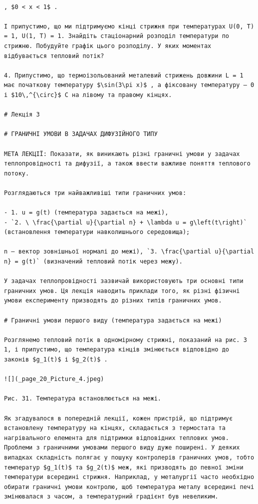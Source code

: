 \documentclass[
]{article}
\begin{document}
\begin{verbatim}

, $0 < x < 1$ .

І припустимо, що ми підтримуємо кінці стрижня при температурах U(0, T) = 1, U(1, T) = 1. Знайдіть стаціонарний розподіл температури по стрижню. Побудуйте графік цього розподілу. У яких моментах відбувається тепловий потік?

4. Припустимо, що термоізольований металевий стрижень довжини L = 1 має початкову температуру $\sin(3\pi x)$ , а фіксовану температуру — 0 і $10\,^{\circ}$ C на лівому та правому кінцях.

# Лекція 3

# ГРАНИЧНІ УМОВИ В ЗАДАЧАХ ДИФУЗІЙНОГО ТИПУ

МЕТА ЛЕКЦІЇ: Показати, як виникають різні граничні умови у задачах теплопровідності та дифузії, а також ввести важливе поняття теплового потоку.

Розглядаються три найважливіші типи граничних умов:

- 1. u = g(t) (температура задається на межі),
- `2. \ \frac{\partial u}{\partial n} + \lambda u = g\left(t\right)` (встановлення температури навколишнього середовища);

n — вектор зовнішньої нормалі до межі), `3. \frac{\partial u}{\partial n} = g(t)` (визначений тепловий потік через межу).

У задачах теплопровідності зазвичай використовують три основні типи граничних умов. Ця лекція наводить приклади того, як різні фізичні умови експерименту призводять до різних типів граничних умов.

# Граничні умови першого виду (температура задається на межі)

Розглянемо тепловий потік в одномірному стрижні, показаний на рис. 3 1, і припустимо, що температура кінців змінюється відповідно до законів $g_1(t)$ і $g_2(t)$ .

![](_page_20_Picture_4.jpeg)

Рис. 31. Температура встановлюється на межі.

Як згадувалося в попередній лекції, кожен пристрій, що підтримує встановлену температуру на кінцях, складається з термостата та нагрівального елемента для підтримки відповідних теплових умов. Проблеми з граничними умовами першого виду дуже поширені. У деяких випадках складність полягає у пошуку контролерів граничних умов, тобто температур $g_1(t)$ та $g_2(t)$ меж, які призводять до певної зміни температури всередині стрижня. Наприклад, у металургії часто необхідно обирати граничні умови контролю, щоб температура металу всередині печі змінювалася з часом, а температурний градієнт був невеликим.


\end{verbatim}
\end{document}
